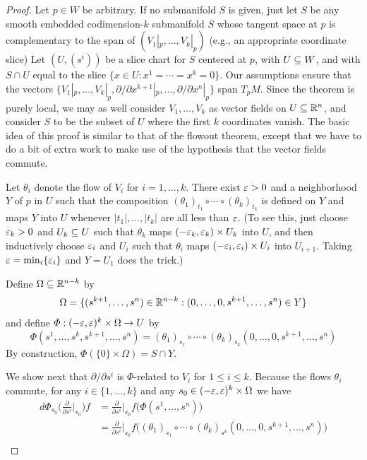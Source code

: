 \begin{proof}
Let $p\in W$ be arbitrary. If no submanifold $S$ is given, just let $S$ be any
smooth embedded codimension-$k$ submanifold $S$ whose tangent space at $p$ is complementary to the span of $(V_1|_p,\dots,V_k|_p)$ (e.g., an appropriate coordinate slice) Let $(U,(s^i))$ be a slice chart for $S$ centered at $p$, with $U\subseteq W$, and with $S\cap U$ equal to the slice $\{x\in U:x^1=\cdots=x^k=0\}$. Our assumptions ensure that the vectors $\{V_1|_p,\dots,V_k|_p,\partial/\partial x^{k+1}|_p,\dots,\partial/\partial x^n|_p\}$ span $T_pM$. Since the theorem is
purely local, we may as well consider $V_1,\dots,V_k$ as vector fields on $U\subseteq\mathbb{R}^n$, and consider $S$ to be the subset of $U$ where the first $k$ coordinates vanish. The basic idea of this proof is similar to that of the flowout theorem, except that we have to do a bit of extra work to make use of the hypothesis that the vector fields commute.\par
Let $\theta_i$ denote the flow of $V_i$ for $i=1,\dots,k$. There exist $\varepsilon>0$ and a neighborhood $Y$ of $p$ in $U$ such that the composition $(\theta_1)_{t_1}\circ\cdots\circ(\theta_k)_{t_k}$ is defined on $Y$ and maps $Y$ into $U$ whenever $|t_1|,\dots,|t_k|$ are all less than $\varepsilon$. (To see this, just choose $\varepsilon_k>0$ and $U_k\subseteq U$ such that $\theta_k$ maps $(-\varepsilon_k,\varepsilon_k)\times U_k$ into $U$, and then inductively choose $\varepsilon_i$ and $U_i$ such that $\theta_i$ maps $(-\varepsilon_i,\varepsilon_i)\times U_i$ into $U_{i+1}$. Taking $\varepsilon=\min_i\{\varepsilon_i\}$ and $Y=U_1$ does the trick.)\par
Define $\Omega\subseteq\mathbb{R}^{n-k}$ by
\[\Omega=\{(s^{k+1},\dots,s^n)\in\mathbb{R}^{n-k}:(0,\dots,0,s^{k+1},\dots,s^n)\in Y\}\]
and define $\varPhi:(-\varepsilon,\varepsilon)^k\times\Omega\to U$ by
\[\varPhi(s^1,\dots,s^k,s^{k+1},\dots,s^n)=(\theta_1)_{s_1}\circ\cdots\circ(\theta_k)_{s_k}(0,\dots,0,s^{k+1},\dots,s^n)\]
By construction, $\varPhi(\{0\}\times\Omega)=S\cap Y$.\par
We show next that $\partial/\partial s^i$ is $\varPhi$-related to $V_i$ for $1\leq i\leq k$. Because the flows $\theta_i$ commute, for any $i\in\{1,\dots,k\}$ and any $s_0\in(-\varepsilon,\varepsilon)^k\times\Omega$ we have
\begin{align*}
d\varPhi_{s_0}\Big(\frac{\partial}{\partial s^i}\Big|_{s_0}\Big)f&=\frac{\partial}{\partial s^i}\Big|_{s_0}f\big(\varPhi(s^1,\dots,s^n)\big)\\
&=\frac{\partial}{\partial s^i}\Big|_{s_0}f\big((\theta_1)_{s_1}\circ\cdots\circ(\theta_k)_{s^k}(0,\dots,0,s^{k+1},\dots,s^n)\big)\\

\end{align*}
\end{proof}
